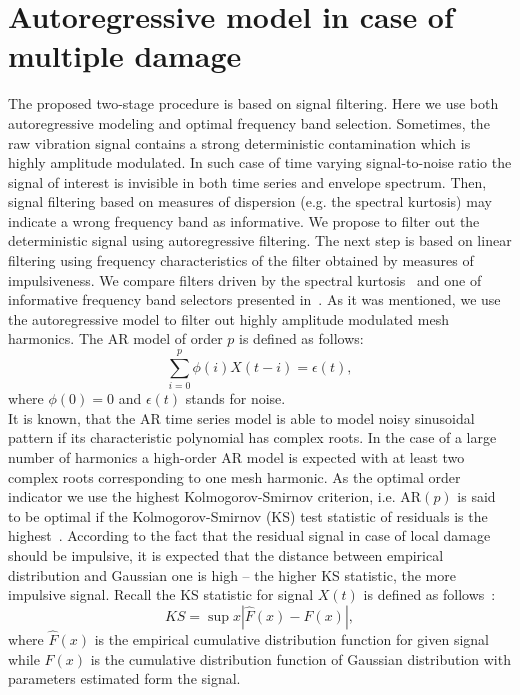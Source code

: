\section{Autoregressive model in case of multiple damage}\label{methodology_twostage}

The proposed two-stage procedure is based on signal filtering. Here we use both autoregressive modeling and optimal frequency band selection. Sometimes, the raw vibration signal contains a strong deterministic contamination which is highly amplitude modulated. In such case of time varying signal-to-noise ratio the signal of interest is invisible in both time series and envelope spectrum. Then, signal filtering based on measures of dispersion (e.g. the spectral kurtosis) may indicate a wrong frequency band as informative. We propose to filter out the deterministic signal using autoregressive filtering. The next step is based on linear filtering using frequency characteristics of the filter obtained by measures of impulsiveness. We compare filters driven by the spectral kurtosis~\cite{Combet2009652} and one of informative frequency band selectors presented in~\cite{Obuchowski2013441,Obuchowski2013,Obuchowski2014138}.
As it was mentioned, we use the autoregressive model to filter out highly amplitude modulated mesh harmonics. The AR model of order $p$ is defined as follows:
\begin{equation}
\sum_{i=0}^p\phi(i)X(t-i)=\epsilon(t),
\end{equation}
where $\phi(0)=0$ and $\epsilon(t)$ stands for noise.\\
It is known, that the AR time series model is able to model noisy sinusoidal pattern if its characteristic polynomial has complex roots. In the case of a large number of harmonics a high-order AR model is expected with at least two complex roots corresponding to one mesh harmonic. As the optimal order indicator we use the highest Kolmogorov-Smirnov criterion, i.e. $\mathrm{AR}(p)$ is said to be optimal if the Kolmogorov-Smirnov (KS) test statistic of residuals is the highest~\cite{Zhan20071953}. According to the fact that the residual signal in case of local damage should be impulsive, it is expected that the distance between empirical distribution and Gaussian one is high – the higher KS statistic, the more impulsive signal. Recall the KS statistic for signal $X(t)$ is defined as follows~\cite{Justel1997251}:
\begin{equation}
KS=\sup{x}\left|\hat{F}(x)-F(x)\right|,
\end{equation}
where $\hat{F}(x)$ is the empirical cumulative distribution function for given signal while $F(x)$ is the cumulative distribution function of Gaussian distribution with parameters estimated form the signal.\\
